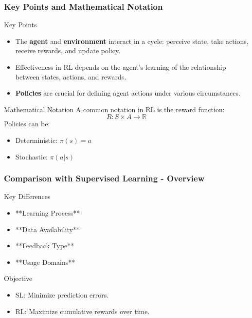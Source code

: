 \documentclass[aspectratio=169]{beamer}
\begin{document}
\begin{frame}[fragile]
    \frametitle{Key Points and Mathematical Notation}
    \begin{block}{Key Points}
        \begin{itemize}
            \item The \textbf{agent} and \textbf{environment} interact in a cycle: perceive state, take actions, receive rewards, and update policy.
            \item Effectiveness in RL depends on the agent's learning of the relationship between states, actions, and rewards.
            \item \textbf{Policies} are crucial for defining agent actions under various circumstances.
        \end{itemize}
    \end{block}
    
    \begin{block}{Mathematical Notation}
        A common notation in RL is the reward function:
        \begin{equation}
            R: S \times A \rightarrow \mathbb{R}
        \end{equation}
        Policies can be:
        \begin{itemize}
            \item Deterministic: \( \pi(s) = a \)
            \item Stochastic: \( \pi(a | s) \)
        \end{itemize}
    \end{block}
\end{frame}

\begin{frame}[fragile]
    \frametitle{Comparison with Supervised Learning - Overview}
    \begin{block}{Key Differences}
        \begin{itemize}
            \item **Learning Process**
            \item **Data Availability**
            \item **Feedback Type**
            \item **Usage Domains**
        \end{itemize}
    \end{block}
    \begin{block}{Objective}
        \begin{itemize}
            \item SL: Minimize prediction errors.
            \item RL: Maximize cumulative rewards over time.
        \end{itemize}
    \end{block}
\end{frame}
\end{document}
